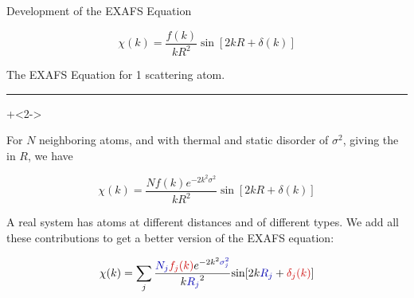 \begin{slide}{Development of the EXAFS Equation}

      \vmm
    \begin{cenpage}{125mm}

      
    \[ \chi(k) = \frac{f(k)}{kR^2} {\sin[{2kR + \delta(k)}]} \]

    \vmm
    The EXAFS Equation for 1 scattering atom.

    \vmm\vmm \hrule \vmm \vmm

    \onslide+<2->

    For $N$ neighboring atoms, and with thermal and static disorder of
    $\sigma^2$, giving the {} in ${R}$, we
    have

    \[ \chi(k) = \frac{N f(k) e^{-2k^2\sigma^2}}{kR^2} \sin{[2kR + \delta(k)]} \]


    A real system has atoms at different distances and of different types.
    We add all these contributions to get a better version of the EXAFS
    equation:

      \vspace{2mm}

      \begin{center}
        \begin{postitbox}{77mm}
    \[ \chi(k) = \sum_j {\frac{{\Blue{N_j}} {\Red{f_j(k)}}
        e^{-2k^2{\Blue{\sigma_j^2}}}}{k{\Blue{R_j}}^2}
      {\sin[{2k{\Blue{R_j}} + {\Red{\delta_j(k)}}] }}} \]
  \end{postitbox}
      \end{center}

\vfill

\end{cenpage}

\end{slide}
